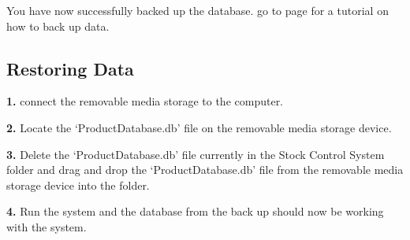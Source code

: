 You have now successfully backed up the database. go to page \pageref{fig:Restoring Data} for a tutorial on how to back up data.

\subsection{Restoring Data}
\label{fig:Restoring Data}

\textbf{1.} connect the removable media storage to the computer.

\textbf{2.} Locate the `ProductDatabase.db' file on the removable media storage device.

\textbf{3.} Delete the `ProductDatabase.db' file currently in the Stock Control System folder and drag and drop the `ProductDatabase.db' file from the removable media storage device into the folder.

\textbf{4.} Run the system and the database from the back up should now be working with the system.